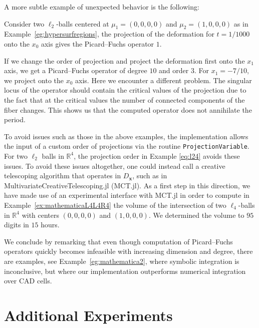 \documentclass[sigconf, nonacm]{acmart} %
\begin{document}
A more subtle example of unexpected behavior is the following:
\begin{example}\label{eg:problem2}
    Consider two $\ell_2$-balls centered at $\mu_1 = (0,0,0,0)$ and $\mu_2 =(1,0,0,0)$ as in Example~\ref{eg:hypersurfregions}, the projection of the deformation for $t = 1/1000$ onto the $x_0$ axis gives the Picard--Fuchs operator $1$. 

    If we change the order of projection and project the deformation first onto the $x_1$ axis, we get a Picard--Fuchs operator of degree $10$ and order $3$. For $x_1 = -7/10$, we project onto the $x_0$ axis. Here we encounter a different problem. The singular locus of the operator should contain the critical values of the projection due to the fact that at the critical values the number of connected components of the fiber changes. This shows us that the computed operator does not annihilate the period. 
\end{example}

To avoid issues such as those in the above examples, the implementation allows the input of a custom order of projections via the routine \texttt{ProjectionVariable}. For two $\ell_2$ balls in $\mathbb R^4$, the projection order in Example \ref{eq:l24} avoids these issues. To avoid these issues altogether, one could instead call a creative telescoping algorithm that operates in $D_\mathbf{x}$, such as in MultivariateCreativeTelescoping.jl \cite{brochet2025fastermultivariateintegrationdmodules} (MCT.jl). 
As a first step in this direction, we have made use of an experimental interface with MCT.jl in order to compute in Example~\ref{ex:mathematicaL4L4R4} the  volume of the intersection of two $\ell_4$-balls in $\mathbb{R}^4$ with centers $(0,0,0,0)$ and $(1,0,0,0)$. We determined the volume to $95$ digits in $15$ hours.

We conclude by remarking that even though computation of Picard--Fuchs operators quickly becomes infeasible with increasing dimension and degree, there are examples, see Example~\ref{eg:mathematica2}, where symbolic integration is inconclusive, but where our implementation outperforms numerical integration over CAD cells.





\section*{Additional Experiments}
\end{document}
